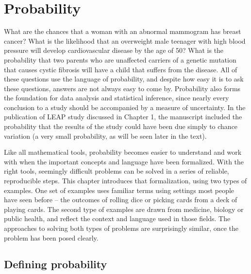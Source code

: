 \chapter{Probability}
\label{probability}






What are the chances that a woman with an abnormal mammogram has breast cancer?  What is the likelihood that an overweight male teenager with high blood pressure will develop cardiovascular disease by the age of 50?  What is the probability that two parents who are unaffected carriers of a genetic mutation that causes cystic fibrosis will have a child that suffers from the disease. All of these questions use the language of probability, and despite how easy it is to ask these questions,  answers are not always easy to come by.  Probability also forms the foundation for data analysis and statistical inference, since nearly every conclusion to a study should be accompanied by a measure of uncertainty.  In the publication of  LEAP study discussed in Chapter 1, the manuscript included the probability that the results of the study could have been due simply to chance variation (a very small probability, as will be seen later in the text).

Like all mathematical tools, probability becomes easier to understand and work with when the important concepts and language have been formalized.   With the right tools, seemingly difficult problems can be solved in a series of reliable, reproducible steps.  This chapter introduces that formalization, using two types of examples.  One set of examples uses familiar terms using settings most people have seen before -- the outcomes of rolling dice or picking cards from a deck of playing cards.  The second type of examples are drawn from medicine, biology or public health, and reflect the context and language used in those fields. The approaches to solving both types of problems are surprisingly similar, once the problem has been posed clearly.

\section{Defining probability}
\label{basicsOfProbability}

